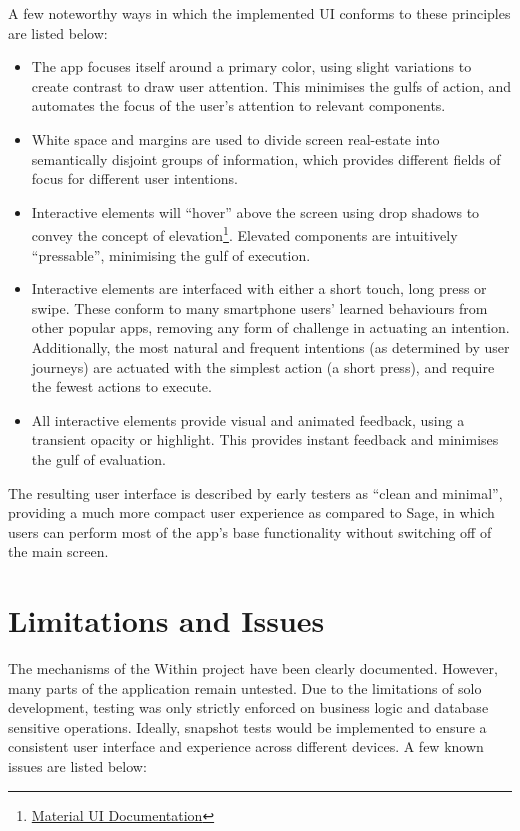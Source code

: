 A few noteworthy ways in which the implemented UI conforms to these principles are listed below:

\begin{itemize}
    \item The app focuses itself around a primary color, using slight variations to create contrast to draw user attention. This minimises the gulfs of action, and automates the focus of the user's attention to relevant components.
    \item White space and margins are used to divide screen real-estate into semantically disjoint groups of information, which provides different fields of focus for different user intentions.
    \item Interactive elements will ``hover'' above the screen using drop shadows to convey the concept of elevation\footnote{\href{https://material.io}{Material UI Documentation}}. Elevated components are intuitively ``pressable'', minimising the gulf of execution.
    \item Interactive elements are interfaced with either a short touch, long press or swipe. These conform to many smartphone users' learned behaviours from other popular apps, removing any form of challenge in actuating an intention. Additionally, the most natural and frequent intentions (as determined by user journeys) are actuated with the simplest action (a short press), and require the fewest actions to execute.
    \item All interactive elements provide visual and animated feedback, using a transient opacity or highlight. This provides instant feedback and minimises the gulf of evaluation.
\end{itemize}

The resulting user interface is described by early testers as ``clean and minimal'', providing a much more compact user experience as compared to Sage, in which users can perform most of the app's base functionality without switching off of the main screen.

\section{Limitations and Issues}
The mechanisms of the Within project have been clearly documented. However, many parts of the application remain untested. Due to the limitations of solo development, testing was only strictly enforced on business logic and database sensitive operations. Ideally, snapshot tests would be implemented to ensure a consistent user interface and experience across different devices. A few known issues are listed below:

